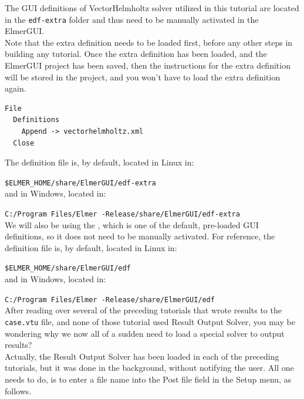 The GUI definitions of VectorHelmholtz solver utilized in this tutorial are located in the \texttt{edf-extra} folder and thus need to be manually activated in the ElmerGUI.\\

Note that the extra definition needs to be loaded first, before any other steps in building any tutorial.  Once the extra definition has been loaded, and the ElmerGUI project has been saved, then the instructions for the extra definition will be stored in the project, and you won't have to load the extra definition again.

\begin{verbatim}
File
  Definitions
    Append -> vectorhelmholtz.xml
  Close
\end{verbatim}

The \texttt{} definition file is, by default, located in Linux in:

\texttt{\$ELMER\_HOME/share/ElmerGUI/edf-extra}\\

and in Windows, located in:

\texttt{C:/Program Files/Elmer \elmerversion{}-Release/share/ElmerGUI/edf-extra}\\

We will also be using the , which is one of the default, pre-loaded GUI definitions, so it does not need to be manually activated.  For reference, the  \texttt{} definition file is, by default, located in Linux in:

\texttt{\$ELMER\_HOME/share/ElmerGUI/edf}\\

and in Windows, located in:

\texttt{C:/Program Files/Elmer \elmerversion{}-Release/share/ElmerGUI/edf}\\

After reading over several of the preceding tutorials that wrote results to the \texttt{case.vtu} file, and none of those tutorial used Result Output Solver, you may be wondering why we now all of a sudden need to load a special solver to output results?\\

Actually, the Result Output Solver has been loaded in each of the preceding tutorials, but it was done in the background, without notifying the user.  All one needs to do, is to enter a file name into the Post file field in the Setup menu, as follows.

